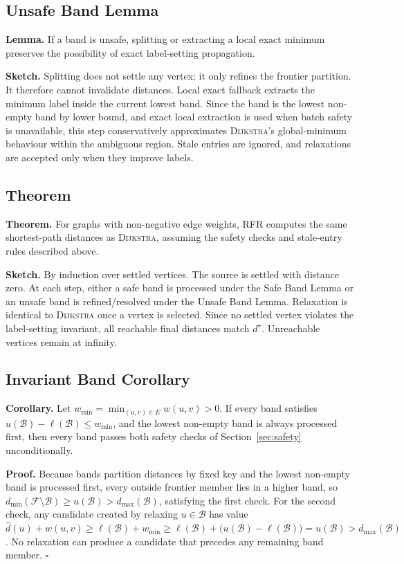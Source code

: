 \documentclass[11pt]{article}
\newcommand{\RFR}{\textsc{RFR}}
\newcommand{\Dijkstra}{\textsc{Dijkstra}}
\newcommand{\frontier}{\mathcal{F}}
\newcommand{\band}{\mathcal{B}}
\newcommand{\edges}{E}
\begin{document}
\subsection{Unsafe Band Lemma}

\textbf{Lemma.} If a band is unsafe, splitting or extracting a local exact minimum preserves the possibility of exact label-setting propagation.

\textbf{Sketch.} Splitting does not settle any vertex; it only refines the frontier partition. It therefore cannot invalidate distances. Local exact fallback extracts the minimum label inside the current lowest band. Since the band is the lowest non-empty band by lower bound, and exact local extraction is used when batch safety is unavailable, this step conservatively approximates \Dijkstra{}'s global-minimum behaviour within the ambiguous region. Stale entries are ignored, and relaxations are accepted only when they improve labels.

\subsection{Theorem}

\textbf{Theorem.} For graphs with non-negative edge weights, \RFR{} computes the same shortest-path distances as \Dijkstra{}, assuming the safety checks and stale-entry rules described above.

\textbf{Sketch.} By induction over settled vertices. The source is settled with distance zero. At each step, either a safe band is processed under the Safe Band Lemma or an unsafe band is refined/resolved under the Unsafe Band Lemma. Relaxation is identical to \Dijkstra{} once a vertex is selected. Since no settled vertex violates the label-setting invariant, all reachable final distances match $d^\star$. Unreachable vertices remain at infinity.

\subsection{Invariant Band Corollary}
\label{sec:invariantcorollary}

\textbf{Corollary.} Let $w_{\min}=\min_{(u,v)\in\edges} w(u,v)>0$. If every band satisfies $u(\band)-\ell(\band)\le w_{\min}$, and the lowest non-empty band is always processed first, then every band passes both safety checks of Section~\ref{sec:safety} unconditionally.

\textbf{Proof.} Because bands partition distances by fixed key and the lowest non-empty band is processed first, every outside frontier member lies in a higher band, so $d_{\min}(\frontier\setminus\band)\ge u(\band)>d_{\max}(\band)$, satisfying the first check. For the second check, any candidate created by relaxing $u\in\band$ has value $\hat d(u)+w(u,v)\ge \ell(\band)+w_{\min}\ge \ell(\band)+\bigl(u(\band)-\ell(\band)\bigr)=u(\band)>d_{\max}(\band)$. No relaxation can produce a candidate that precedes any remaining band member. $\square$
\end{document}
